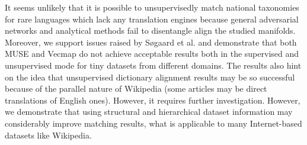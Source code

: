 \documentclass[conference]{IEEEtran}
\begin{document}
It seems unlikely that it is possible to unsupervisedly match national taxonomies for rare languages which lack any translation engines because general adversarial networks and analytical methods fail to disentangle align the studied manifolds. Moreover, we support issues raised by Søgaard et al. \cite{ruder-muse-limitations} and demonstrate that both MUSE and Vecmap do not achieve acceptable results both in the supervised and unsupervised mode for tiny datasets from different domains.
The results also hint on the idea that unsupervised dictionary alignment results may be so successful because of the parallel nature of Wikipedia (some articles may be direct translations of English ones). However, it requires further investigation.
However, we demonstrate that using structural and hierarchical dataset information may considerably improve matching results, what is applicable to many Internet-based datasets like Wikipedia.
%
%
\printbibliography
\end{document}

